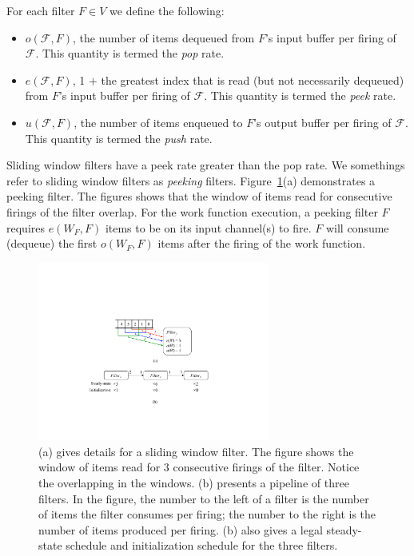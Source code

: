 For each filter $F \in V$ we define the following:
\begin{itemize}

\item $o(\mathcal{F}, F)$, the number of items dequeued from $F$'s
input buffer per firing of $\mathcal{F}$.  This quantity is termed the
{\it pop} rate.

\item $e(\mathcal{F}, F)$, 1 $+$ the greatest index that is read (but
  not necessarily dequeued) from $F$'s input buffer per firing of
  $\mathcal{F}$.  This quantity is termed the {\it peek} rate.

\item $u(\mathcal{F}, F)$, the number of items enqueued to $F$'s
output buffer per firing of $\mathcal{F}$.  This quantity is termed
the {\it push} rate.

\end{itemize}

\noindent Sliding window filters have a peek rate greater than the pop
rate.  We somethings refer to sliding window filters as {\it peeking}
filters. Figure~\ref{fig:pipeline-example}(a)
demonstrates a peeking filter.  The figures shows that the window of
items read for consecutive firings of the filter overlap.  For the
work function execution, a peeking filter $F$ requires $e(W_F, F)$
items to be on its input channel(s) to fire.  $F$ will consume
(dequeue) the first $o(W_F, F)$ items after the firing of the work function.

\begin{figure}[t]
\centering
\includegraphics[width=3.0in]{figures/pipeline-example.pdf}
\caption[A pipeline of three filters with schedules.]{ (a) gives
  details for a sliding window filter.  The figure
  shows the window of items read for 3 consecutive firings of the
  filter.  Notice the overlapping in the windows.  (b) presents a pipeline of
  three filters.  In the figure, the number to the left of a filter is
  the number of items the filter consumes per firing; the number to
  the right is the number of items produced per firing.  (b) also gives a
  legal steady-state schedule and initialization schedule for the three filters. 
  \label{fig:pipeline-example}}
\end{figure}

